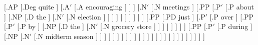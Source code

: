 \documentclass{article}
\begin{document}
\begin{landscape}
{                                                                         [.AP [.{Deg\textsubscript{\rbrack}} quite ]
                                                                              [.A$'$ [.{A\degree\textsubscript{\rbrack}} encouraging ] ] ]
                                                                         [.N$'$ [.{N\degree\textsubscript{\rbrack}} meetings ]
                                                                                [.PP [.P$'$ [.{P\degree} about ]
                                                                                            [.NP [.{D\textsubscript{\rbrack}} the ]
                                                                                                 [.N$'$ [.{N\degree\textsubscript{\rbrack}} election ] ] ] ] ] ] ] ] ] ]
                                                [.PP [.{PD\textsubscript{\rbrack}} just ]
                                                     [.P$'$ [.{P\degree} over ]
                                                            [.PP [.P$'$ [.{P\degree} by ]
                                                                        [.NP [.{D\textsubscript{\rbrack}} the ]
                                                                             [.N$'$ [.{N\degree\textsubscript{\rbrack}} {grocery store} ] ] ] ] ] ] ] ]
                                         [.PP [.P$'$ [.{P\degree} during ]
                                              [.NP [.N$'$ [.{N\degree\textsubscript{\rbrack}} {midterm season} ] ] ] ] ] ] ] ] ] ] ] ] ] ]
] ] ] ] ] ] ] ] ] ] ] ]
}


\end{landscape}
\end{document}
